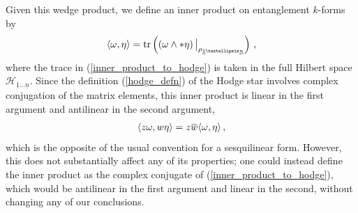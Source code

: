 \documentclass[12pt]{article}
\newcommand{\ul}[1]{{\underline{#1}}}
\numberwithin{equation}{section}
\newcommand{\overbar}[1]{\mkern 1.5mu\overline{\mkern-1.5mu#1\mkern-1.5mu}\mkern 1.5mu}
\newcommand{\Honeton}{{\mathcal{H}_{\ul{1} \ldots \ul{n}}}}
\newcommand{\rhooneton}{{\rho_{\ul{1} \ldots \ul{n}}}}
\begin{document}
Given this wedge product, we define an inner product on entanglement $k$-forms by
%
%
\begin{align}\label{inner_product_to_hodge}
    \langle \omega, \eta \rangle = \tr \left( \left( \omega \wedge \ast \eta \right) \big\vert_{\rhooneton} \right) \, ,
\end{align}
%
where the trace in (\ref{inner_product_to_hodge}) is taken in the full Hilbert space $\Honeton$. Since the definition (\ref{hodge_defn}) of the Hodge star involves complex conjugation of the matrix elements, this inner product is linear in the first argument and antilinear in the second argument,
%
\begin{align}
    \langle z \omega, w \eta \rangle = z \overbar{w} \langle \omega , \eta \rangle \, ,
\end{align}
%
which is the opposite of the usual convention for a sesquilinear form. However, this does not substantially affect any of its properties; one could instead define the inner product as the complex conjugate of (\ref{inner_product_to_hodge}), which would be antilinear in the first argument and linear in the second, without changing any of our conclusions.
\end{document}
